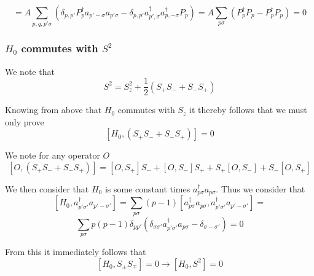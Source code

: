 \documentclass[11pt]{article} %
\begin{document}
\begin{equation}
= A\sum_{p,q,p'\sigma} \left(\delta_{p,p'}P_p^\dagger a_{p'-\sigma}a_{p'\sigma}-\delta_{p,p'}a_{p',\sigma}^\dagger a^\dagger_{p,-\sigma}P_p\right)=A\sum_{p\sigma} \left(P_p^\dagger P_p-P_p^\dagger P_p\right)=0\end{equation}


\subsubsection{$H_0$ commutes with $S^2$}

We note that \\
\begin{equation}
S^2=S_z^2+\frac{1}{2}\left(S_+S_- +S_-S_+ \right)
\end{equation}

Knowing from above that $H_0$ commutes with $S_z$ it thereby follows that  we must only prove\\

\begin{equation}
\left[H_0,\left(S_+S_- +S_-S_+ \right)\right]=0
\end{equation}

We note for any operator $O$ \\

\begin{equation}
\left[O,\left(S_+S_- +S_-S_+ \right)\right] =\left[O,S_+\right]S_-+\left[O,S_-\right]S_+ + S_+\left[O,S_-\right]+S_-\left[O,S_+\right]
\end{equation}


We then consider that $H_0$ is some constant  times $a_{p\sigma}^\dagger a_{p\sigma}$. Thus we consider that\\

\begin{equation}
\left[H_0,a_{p'\sigma'}^\dagger a_{p'-\sigma'}\right]=\sum_{p\sigma} (p-1) \left[a_{p\sigma}^\dagger a_{p\sigma},a_{p'\sigma'}^\dagger a_{p' -\sigma'} \right]=\end{equation}\begin{equation}\sum_{p\sigma} p(p-1) \delta_{p p'} \left(\delta_{\sigma \sigma'}a_{p' \sigma'}^\dagger a_{p\sigma}-\delta_{\sigma -\sigma'}\right)=0
\end{equation}

From this it immediately follows that \\

\begin{equation}
\left[H_0,S_\pm S_\mp\right]=0 \rightarrow \left[H_0,S^2\right]=0\end{equation}
\end{document}
